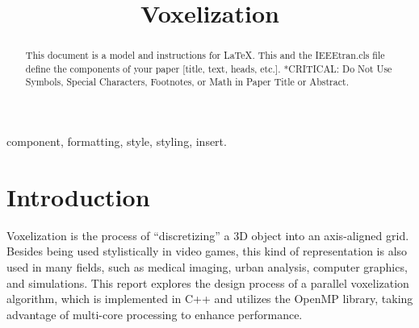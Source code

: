 \documentclass[conference]{IEEEtran}
\begin{document}
\title{Voxelization}

\author{
    \and
    \and
}

\maketitle

\begin{abstract}
    This document is a model and instructions for \LaTeX.
    This and the IEEEtran.cls file define the components of your paper [title, text, heads, etc.]. *CRITICAL: Do Not Use Symbols, Special Characters, Footnotes,
    or Math in Paper Title or Abstract.
\end{abstract}

\begin{IEEEkeywords}
    component, formatting, style, styling, insert.
\end{IEEEkeywords}

\section{Introduction}
Voxelization is the process of ``discretizing'' a 3D object into an
axis-aligned grid. Besides being used stylistically in video games, this kind
of representation is also used in many fields, such as medical imaging, urban
analysis, computer graphics, and simulations. This report explores the design
process of a parallel voxelization algorithm, which is implemented in C++ and
utilizes the OpenMP library, taking advantage of multi-core processing to
enhance performance.
\end{document}
